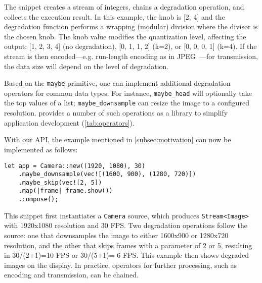 The snippet creates a stream of integers, chains a degradation operation, and
collects the execution result. In this example, the knob is [2, 4] and the
degradation function performs a wrapping (modular) division where the divisor is
the chosen knob. The knob value modifies the quantization level, affecting the
output: [1, 2, 3, 4] (no degradation), [0, 1, 1, 2] (k=2), or [0, 0, 0, 1]
(k=4). If the stream is then encoded---e.g. run-length encoding as in
JPEG~\cite{wallace1992jpeg}---for transmission, the data size will depend on the
level of degradation.

Based on the \texttt{maybe} primitive, one can implement additional degradation
operators for common data types. For instance, \texttt{maybe\_head} will
optionally take the top values of a list; \texttt{maybe\_downsample} can resize
the image to a configured resolution. \sysname{} provides a number of such
operations as a library to simplify application development
(\autoref{tab:operators}).

With our API, the example mentioned in \autoref{subsec:motivation} can now be
implemented as follows:

\vspace{-2pt}
\begin{lstlisting}
let app = Camera::new((1920, 1080), 30)
    .maybe_downsample(vec![(1600, 900), (1280, 720)])
    .maybe_skip(vec![2, 5])
    .map(|frame| frame.show())
    .compose();
\end{lstlisting}

This snippet first instantiates a \texttt{Camera} source, which produces
\texttt{Stream<Image>} with 1920x1080 resolution and 30 FPS\@. Two degradation
operations follow the source: one that downsamples the image to either 1600x900
or 1280x720 resolution, and the other that skips frames with a parameter of 2 or
5, resulting in 30/(2+1)=10 FPS or 30/(5+1)= 6 FPS\@. This example then shows
degraded images on the display. In practice, operators for further processing,
such as encoding and transmission, can be chained.



